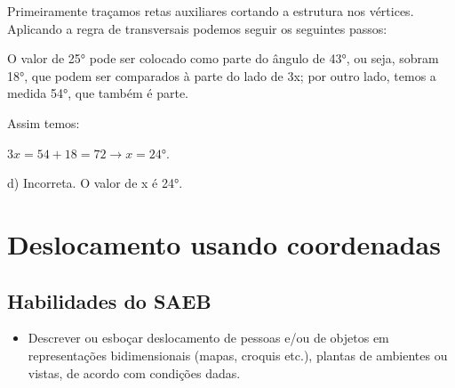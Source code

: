 \begin{escolha}
\begin{boxmedio}
\begin{boxmedio}
{\begin{boxpeq}
\begin{boxpeq}
{\begin{boxpeq}
\begin{boxmedio}
\begin{boxmedio}
\begin{boxpeq}
\begin{boxmedio}
\begin{boxpeq}
\begin{boxpeq}
\begin{boxpeq}
\begin{boxpeq}
\begin{boxmedio}
{\begin{boxmedio}
\begin{boxmedio}
\begin{boxpeq}
\begin{boxmedio}
\begin{boxpeq}
\begin{boxpeq}
\begin{boxpeq}
\begin{escolha}
{\begin{boxmedio}
\begin{boxpeq}
\begin{boxpeq}
\begin{boxpeq}
\begin{boxpeq}
\begin{boxpeq}
\begin{boxmedio}
\begin{boxpeq}
\begin{boxpeq}
\begin{boxpeq}
{\begin{boxpeq}
\begin{boxmedio}
\begin{boxpeq}
\begin{boxpeq}
\begin{boxpeq}
{\begin{boxpeq}
\begin{boxmedio}
{\begin{boxpeq}
\begin{boxpeq}
\begin{boxmedio}
\begin{boxmedio}
\begin{boxpeq}
\begin{boxpeq}
{\begin{boxpeq}
\begin{boxpeq}
\begin{boxpeq}
\begin{boxpeq}
\begin{boxpeq}
\begin{escolha}
\begin{escolha}
{\begin{boxmedio}
\begin{boxpeq}
\begin{q°}
\begin{boxmedio}
\begin{boxpeq}
\begin{boxpeq}
\begin{boxmedio}
\begin{boxmedio}
\begin{boxmedio}
{Primeiramente traçamos retas auxiliares cortando a estrutura nos
vértices. Aplicando a regra de transversais podemos seguir os seguintes
passos:

O valor de 25° pode ser colocado como parte do ângulo de 43°, ou seja,
sobram 18°, que podem ser comparados à parte do lado de 3x; por outro lado,
temos a medida 54°, que também é parte.

Assim temos:

$3x = 54 + 18 = 72 \rightarrow x = 24$°.

d) Incorreta. O valor de x é 24°.}

\chapter{Deslocamento usando coordenadas}

\section{Habilidades do SAEB}

\begin{itemize}

  \item Descrever ou esboçar deslocamento de pessoas e/ou de objetos em
representações bidimensionais (mapas, croquis etc.), plantas de
ambientes ou vistas, de acordo com condições dadas.   


\end{itemize}
\end{boxmedio}
\end{boxmedio}
\end{boxmedio}
\end{boxpeq}
\end{boxpeq}
\end{boxmedio}
\end{q°}
\end{boxpeq}
\end{boxmedio}}
\end{escolha}
\end{escolha}
\end{boxpeq}
\end{boxpeq}
\end{boxpeq}
\end{boxpeq}
\end{boxpeq}}
\end{boxpeq}
\end{boxpeq}
\end{boxmedio}
\end{boxmedio}
\end{boxpeq}
\end{boxpeq}}
\end{boxmedio}
\end{boxpeq}}
\end{boxpeq}
\end{boxpeq}
\end{boxpeq}
\end{boxmedio}
\end{boxpeq}}
\end{boxpeq}
\end{boxpeq}
\end{boxpeq}
\end{boxmedio}
\end{boxpeq}
\end{boxpeq}
\end{boxpeq}
\end{boxpeq}
\end{boxpeq}
\end{boxmedio}}
\end{escolha}
\end{boxpeq}
\end{boxpeq}
\end{boxpeq}
\end{boxmedio}
\end{boxpeq}
\end{boxmedio}
\end{boxmedio}}
\end{boxmedio}
\end{boxpeq}
\end{boxpeq}
\end{boxpeq}
\end{boxpeq}
\end{boxmedio}
\end{boxpeq}
\end{boxmedio}
\end{boxmedio}
\end{boxpeq}}
\end{boxpeq}
\end{boxpeq}}
\end{boxmedio}
\end{boxmedio}
\end{escolha}

